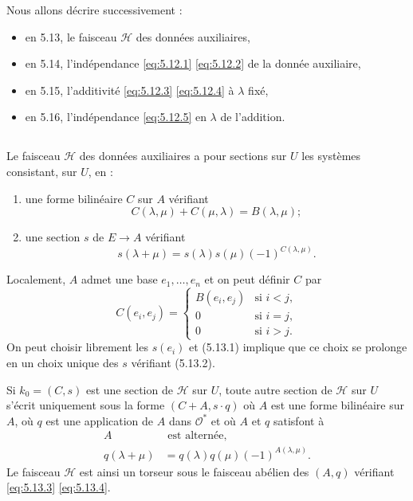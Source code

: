 \documentclass[12pt,a4paper]{article}
\theoremstyle{plain}
\theoremstyle{definition}
\theoremstyle{remark}
\newcommand{\cO}{\mathcal{O}}
\providecommand{\cO}{\mathcal{O}}
\begin{document}
Nous allons décrire successivement :
\begin{itemize}
\item en 5.13, le faisceau $\mathscr{H}$ des données auxiliaires,
\item en 5.14, l'indépendance \eqref{eq:5.12.1} \eqref{eq:5.12.2} de la donnée auxiliaire,
\item en 5.15, l'additivité \eqref{eq:5.12.3} \eqref{eq:5.12.4} à $\lambda$ fixé,
\item en 5.16, l'indépendance \eqref{eq:5.12.5} en $\lambda$ de l'addition.
\end{itemize}

\subsection{}

Le faisceau $\mathscr{H}$ des données auxiliaires a pour sections sur $U$ les systèmes
consistant, sur $U$, en :
\begin{enumerate}[label=(\arabic*)]
\item[(5.13.1)] une forme bilinéaire $C$ sur $A$ vérifiant
\[
C(\lambda, \mu) + C(\mu, \lambda) = B(\lambda, \mu);
\]
\item[(5.13.2)] une section $s$ de $E \to A$ vérifiant
\[
s(\lambda + \mu) = s(\lambda) s(\mu) (-1)^{C(\lambda, \mu)}.
\]
\end{enumerate}
Localement, $A$ admet une base $e_1, \ldots, e_n$ et on peut définir $C$ par
\[
C(e_i, e_j) = \begin{cases}
B(e_i, e_j) & \text{si } i < j, \\
0 & \text{si } i = j, \\
0 & \text{si } i > j.
\end{cases}
\]
On peut choisir librement les $s(e_i)$ et (5.13.1) implique que ce choix se prolonge
en un choix unique des $s$ vérifiant (5.13.2).

Si $k_0 = (C, s)$ est une section de $\mathscr{H}$ sur $U$, toute autre section de $\mathscr{H}$ sur $U$ s'écrit
uniquement sous la forme $(C + A, s \cdot q)$ où $A$ est une forme bilinéaire sur $A$, où $q$ est
une application de $A$ dans $\cO^*$ et où $A$ et $q$ satisfont à
\begin{align}
A &\text{ est alternée}, \label{eq:5.13.3} \\
q(\lambda + \mu) &= q(\lambda) q(\mu) (-1)^{A(\lambda, \mu)}. \label{eq:5.13.4}
\end{align}
Le faisceau $\mathscr{H}$ est ainsi un torseur sous le faisceau abélien des $(A, q)$ vérifiant
\eqref{eq:5.13.3} \eqref{eq:5.13.4}.
\end{document}
